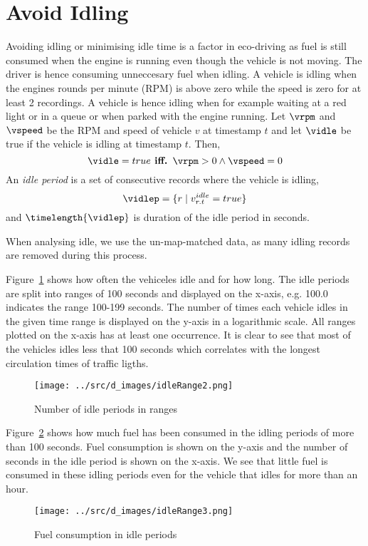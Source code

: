 \section{Avoid Idling}

Avoiding idling or minimising idle time is a factor in eco-driving as fuel is still consumed when the engine is running even though the vehicle is not moving.
The driver is hence consuming unneccesary fuel when idling.
A vehicle is idling when the engines rounds per minute (RPM) is above zero while the speed is zero for at least 2 recordings.
A vehicle is hence idling when for example waiting at a red light or in a queue or when parked with the engine running. 
Let $\vrpm$ and $\vspeed$ be the RPM and speed of vehicle $v$ at timestamp $t$ and let $\vidle$ be true if the vehicle is idling at timestamp $t$.
Then,
\[\vidle = true \mbox{\textbf{ iff. }} \vrpm> 0 \wedge \vspeed=0 \]
An \textit{idle period} is a set of consecutive records where the vehicle is idling,
\[\vidlep = \{r \mid v_{r.t}^{idle}= true \}\]
and $\timelength{\vidlep}$ is duration of the idle period in seconds.

When analysing idle, we use the un-map-matched data, as many idling records are removed during this process. 

Figure~\ref{fig:idleRange2} shows how often the vehiceles idle and for how long.
The idle periods are split into ranges of 100 seconds and displayed on the x-axis, e.g. 100.0 indicates the range 100-199 seconds. 
The number of times each vehicle idles in the given time range is displayed on the y-axis in a logarithmic scale. 
All ranges plotted on the x-axis has at least one occurrence.
It is clear to see that most of the vehicles idles less that 100 seconds which correlates with the longest circulation times of traffic ligths. 
\begin{figure}[htb]
\centering
\texttt{[image: ../src/d\_images/idleRange2.png]}
\caption{Number of idle periods in ranges}
\label{fig:idleRange2}
\end{figure}

Figure~\ref{fig:idleRange3} shows how much fuel has been consumed in the idling periods of more than 100 seconds. 
Fuel consumption is shown on the y-axis and the number of seconds in the idle period is shown on the x-axis.
We see that little fuel is consumed in these idling periods even for the vehicle that idles for more than an hour.
\begin{figure}[htb]
\centering
\texttt{[image: ../src/d\_images/idleRange3.png]}
\caption{Fuel consumption in idle periods}
\label{fig:idleRange3}
\end{figure}

